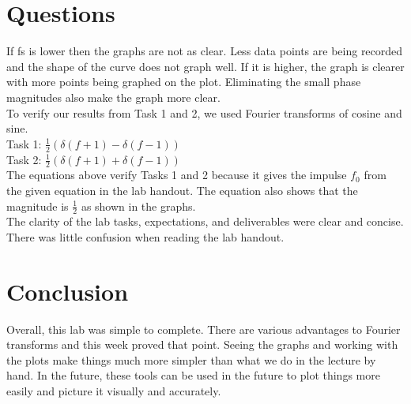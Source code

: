 \documentclass[12pt]{report}
\begin{document}
\section{Questions}
If fs is lower then the graphs are not as clear. Less data points are being recorded and the shape of the curve does not graph well. If it is higher, the graph is clearer with more points being graphed on the plot. Eliminating the small phase magnitudes also make the graph more clear. \\

\noindent To verify our results from Task 1 and 2, we used Fourier transforms of cosine and sine. \\

\noindent Task 1: $\frac{1}{2}(\delta(f+1)-\delta(f-1))$\\

\noindent Task 2: $\frac{1}{2}(\delta(f+1)+\delta(f-1))$\\

\noindent The equations above verify Tasks 1 and 2 because it gives the impulse $f_0$ from the given equation in the lab handout. The equation also shows that the magnitude is $\frac{1}{2}$ as shown in the graphs. \\


\noindent The clarity of the lab tasks, expectations, and deliverables were clear and concise. There was little confusion when reading the lab handout. 

\section{Conclusion}
Overall, this lab was simple to complete. There are various advantages to Fourier transforms and this week proved that point. Seeing the graphs and working with the plots make things much more simpler than what we do in the lecture by hand. In the future, these tools can be used in the future to plot things more easily and picture it visually and accurately. 
\end{document}
